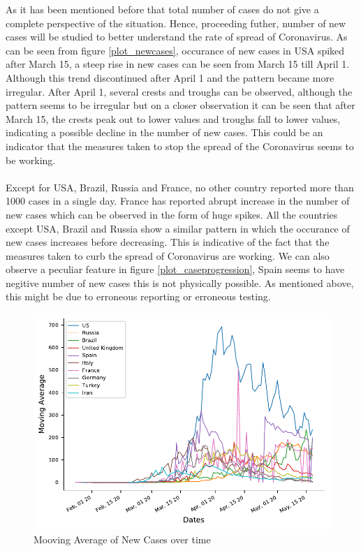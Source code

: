 \documentclass[12pt, twosided]{report}  %
\begin{document}
As it has been mentioned before that total number of cases do not give a complete perspective of the situation. Hence, proceeding futher, number of new cases will be studied to better understand the rate of spread of Coronavirus. As can be seen from figure \ref{plot_newcases}, occurance of new cases in USA spiked after March 15, a steep rise in new cases can be seen from March 15 till April 1. Although this trend discontinued after April 1 and the pattern became more irregular. After April 1, several crests and troughs can be observed, although the pattern seems to be irregular but on a closer observation it can be seen that after March 15, the crests peak out to lower values and troughs fall to lower values, indicating a possible decline in the number of new cases. This could be an indicator that the measures taken to stop the spread of the Coronavirus seems to be working.
\\
\\
Except for USA, Brazil, Russia and France, no other country reported more than 1000 cases in a single day. France has reported abrupt increase in the number of new cases which can be observed in the form of huge  spikes. All the countries except USA, Brazil and Russia show a similar pattern in which the occurance of new cases increases before decreasing. This is indicative of the fact that the measures taken to curb the spread of Coronavirus are working. We can also observe a peculiar feature in figure \ref{plot_caseprogression}, Spain seems to have negitive number of new cases this is not physically possible. As mentioned above, this might be due to erroneous reporting or erroneous testing.

\begin{figure}[H]
	\centering
	\includegraphics[width=0.5\linewidth]{./images/plot-5.pdf}
	\caption{Mooving Average of New Cases over time}
	\label{plot_newcasesMA}
\end{figure} 
\end{document}
